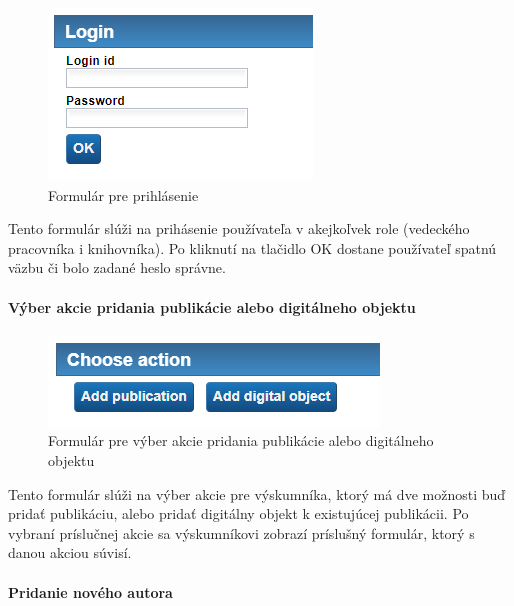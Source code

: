 \documentclass[10pt,oneside,slovak,a4paper]{article}
\begin{document}
\begin{figure} [H]
\centering
\includegraphics[scale=0.4]{forms/Coachforlogin.png} 
\caption{Formulár pre prihlásenie}
\end{figure}

Tento formulár slúži na prihásenie používateľa v akejkoľvek role (vedeckého pracovníka i knihovníka). Po kliknutí na tlačidlo OK dostane používateľ spatnú väzbu či bolo zadané heslo správne.

\paragraph{Výber akcie pridania publikácie alebo digitálneho objektu}

\begin{figure} [H]
\centering
\includegraphics[scale=0.4]{forms/Coachforresearchaction.png} 
\caption{Formulár pre výber akcie pridania publikácie alebo digitálneho objektu}
\end{figure}

Tento formulár slúži na výber akcie pre výskumníka, ktorý má dve možnosti buď pridať publikáciu, alebo pridať digitálny objekt k existujúcej publikácii.
Po vybraní príslučnej akcie sa výskumníkovi zobrazí príslušný formulár, ktorý s danou akciou súvisí.

\paragraph{Pridanie nového autora}
\end{document}
